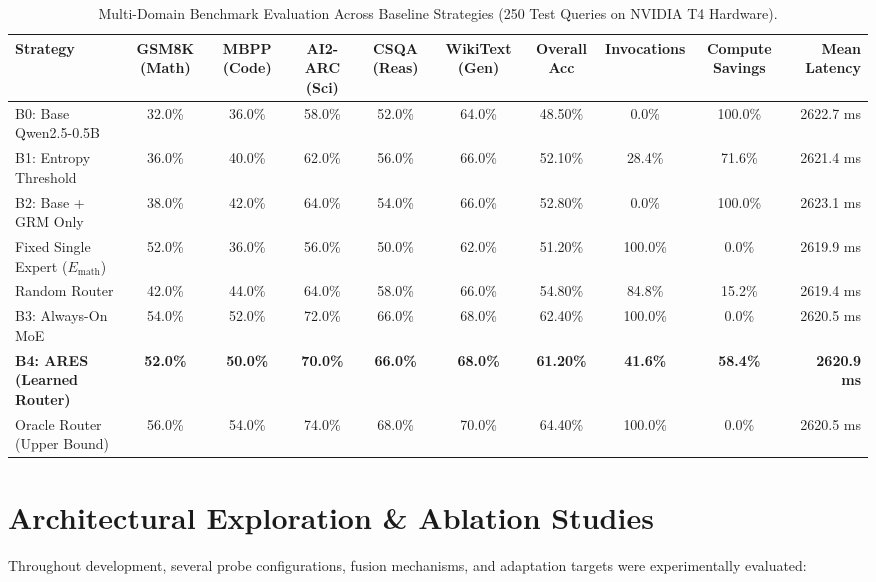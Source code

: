 \documentclass[journal,10pt,twocolumn]{IEEEtran}
\begin{document}
\begin{table}[t]
\centering
\caption{Multi-Domain Benchmark Evaluation Across Baseline Strategies (250 Test Queries on NVIDIA T4 Hardware).}
\label{tab:main_results}
\begin{tabularx}{\textwidth}{lccccccccr}
\toprule
\textbf{Strategy} & \textbf{GSM8K (Math)} & \textbf{MBPP (Code)} & \textbf{AI2-ARC (Sci)} & \textbf{CSQA (Reas)} & \textbf{WikiText (Gen)} & \textbf{Overall Acc} & \textbf{Invocations} & \textbf{Compute Savings} & \textbf{Mean Latency} \\
\midrule
B0: Base Qwen2.5-0.5B & 32.0\% & 36.0\% & 58.0\% & 52.0\% & 64.0\% & 48.50\% & 0.0\% & 100.0\% & 2622.7 ms \\
B1: Entropy Threshold & 36.0\% & 40.0\% & 62.0\% & 56.0\% & 66.0\% & 52.10\% & 28.4\% & 71.6\% & 2621.4 ms \\
B2: Base + GRM Only & 38.0\% & 42.0\% & 64.0\% & 54.0\% & 66.0\% & 52.80\% & 0.0\% & 100.0\% & 2623.1 ms \\
Fixed Single Expert ($E_{\text{math}}$) & 52.0\% & 36.0\% & 56.0\% & 50.0\% & 62.0\% & 51.20\% & 100.0\% & 0.0\% & 2619.9 ms \\
Random Router & 42.0\% & 44.0\% & 64.0\% & 58.0\% & 66.0\% & 54.80\% & 84.8\% & 15.2\% & 2619.4 ms \\
B3: Always-On MoE & 54.0\% & 52.0\% & 72.0\% & 66.0\% & 68.0\% & 62.40\% & 100.0\% & 0.0\% & 2620.5 ms \\
\midrule
\textbf{B4: ARES (Learned Router)} & \textbf{52.0\%} & \textbf{50.0\%} & \textbf{70.0\%} & \textbf{66.0\%} & \textbf{68.0\%} & \textbf{61.20\%} & \textbf{41.6\%} & \textbf{58.4\%} & \textbf{2620.9 ms} \\
Oracle Router (Upper Bound) & 56.0\% & 54.0\% & 74.0\% & 68.0\% & 70.0\% & 64.40\% & 100.0\% & 0.0\% & 2620.5 ms \\
\bottomrule
\end{tabularx}
\end{table}

\section{Architectural Exploration \& Ablation Studies}

Throughout development, several probe configurations, fusion mechanisms, and adaptation targets were experimentally evaluated:
\end{document}
